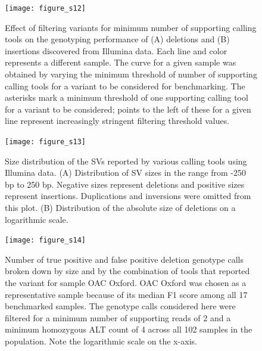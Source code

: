 \documentclass[12pt]{article}
\newenvironment{cfigure}
	{\begin{figure} \centering}
	{\end{figure}}
\newenvironment{lsfigure}
	{\begin{landscape} \begin{figure} \centering}
	{\end{figure} \end{landscape}}
\begin{document}
\begin{cfigure}
	\texttt{[image: figure\_s12]}

	\caption[Effect of the number of supporting calling tools on genotyping performance of Illumina deletions and insertions]{
		Effect of filtering variants for minimum number of supporting calling tools on the genotyping performance of (A) deletions and (B) insertions discovered from Illumina data.
		Each line and color represents a different sample.
		The curve for a given sample was obtained by varying the minimum threshold of number of supporting calling tools for a variant to be considered for benchmarking.
		The asterisks mark a minimum threshold of one supporting calling tool for a variant to be considered; points to the left of these for a given line represent increasingly stringent filtering threshold values.
		}

	\label{fig_s12}

\end{cfigure}

\clearpage%

\begin{cfigure}
	\texttt{[image: figure\_s13]}

	\caption[Size distribution of the SVs reported by various calling tools using Illumina data]{
		Size distribution of the SVs reported by various calling tools using Illumina data.
		(A) Distribution of SV sizes in the range from -250 bp to 250 bp.
		Negative sizes represent deletions and positive sizes represent insertions.
		Duplications and inversions were omitted from this plot.
		(B) Distribution of the absolute size of deletions on a logarithmic scale.
	}

	\label{fig_s13}

\end{cfigure}

\clearpage%

\begin{lsfigure}
	\texttt{[image: figure\_s14]}

	\caption[Number of true positive and false positive deletion calls reported by various calling tool combinations]{
		Number of true positive and false positive deletion genotype calls broken down by size and by the combination of tools that reported the variant for sample OAC Oxford.
		OAC Oxford was chosen as a representative sample because of its median F1 score among all 17 benchmarked samples.
		The genotype calls considered here were filtered for a minimum number of supporting reads of 2 and a minimum homozygous ALT count of 4 across all 102 samples in the population.
		Note the logarithmic scale on the x-axis.
	}

	\label{fig_s14}

\end{lsfigure}
\end{document}
